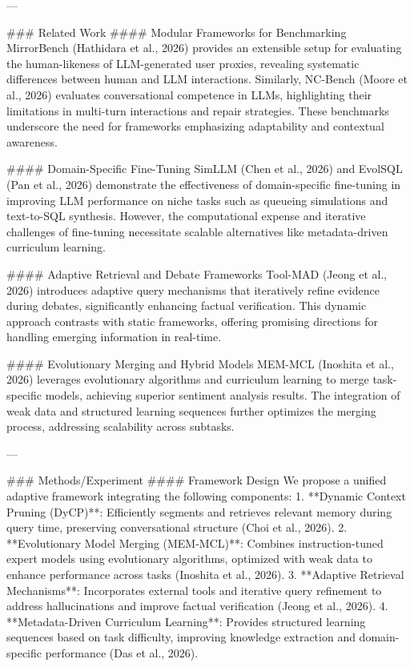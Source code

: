 ---

### Related Work  
#### Modular Frameworks for Benchmarking  
MirrorBench (Hathidara et al., 2026) provides an extensible setup for evaluating the human-likeness of LLM-generated user proxies, revealing systematic differences between human and LLM interactions. Similarly, NC-Bench (Moore et al., 2026) evaluates conversational competence in LLMs, highlighting their limitations in multi-turn interactions and repair strategies. These benchmarks underscore the need for frameworks emphasizing adaptability and contextual awareness.  

#### Domain-Specific Fine-Tuning  
SimLLM (Chen et al., 2026) and EvolSQL (Pan et al., 2026) demonstrate the effectiveness of domain-specific fine-tuning in improving LLM performance on niche tasks such as queueing simulations and text-to-SQL synthesis. However, the computational expense and iterative challenges of fine-tuning necessitate scalable alternatives like metadata-driven curriculum learning.  

#### Adaptive Retrieval and Debate Frameworks  
Tool-MAD (Jeong et al., 2026) introduces adaptive query mechanisms that iteratively refine evidence during debates, significantly enhancing factual verification. This dynamic approach contrasts with static frameworks, offering promising directions for handling emerging information in real-time.  

#### Evolutionary Merging and Hybrid Models  
MEM-MCL (Inoshita et al., 2026) leverages evolutionary algorithms and curriculum learning to merge task-specific models, achieving superior sentiment analysis results. The integration of weak data and structured learning sequences further optimizes the merging process, addressing scalability across subtasks.  

---

### Methods/Experiment  
#### Framework Design  
We propose a unified adaptive framework integrating the following components:  
1. **Dynamic Context Pruning (DyCP)**: Efficiently segments and retrieves relevant memory during query time, preserving conversational structure (Choi et al., 2026).  
2. **Evolutionary Model Merging (MEM-MCL)**: Combines instruction-tuned expert models using evolutionary algorithms, optimized with weak data to enhance performance across tasks (Inoshita et al., 2026).  
3. **Adaptive Retrieval Mechanisms**: Incorporates external tools and iterative query refinement to address hallucinations and improve factual verification (Jeong et al., 2026).  
4. **Metadata-Driven Curriculum Learning**: Provides structured learning sequences based on task difficulty, improving knowledge extraction and domain-specific performance (Das et al., 2026).  

